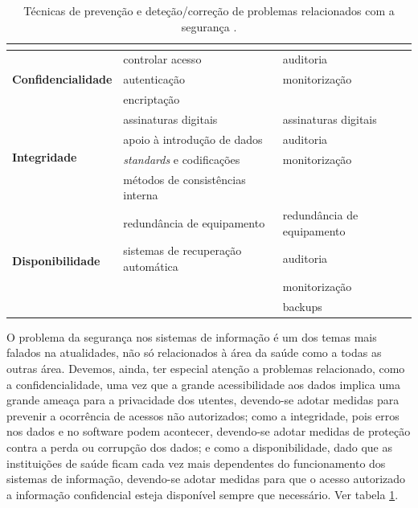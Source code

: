 \documentclass[conference]{IEEEtran}
\begin{document}
\begin{table}[!ht]
\centering
\caption{Técnicas de prevenção e deteção/correção de problemas relacionados com a segurança \cite{segurancaSI}.}
\label{tabl1}
\begin{adjustbox}{max width=\textwidth 	}
\begin{tabular}{ |l|l|l| }

\hline
	\multicolumn{1}{|c|}{\cellcolor[HTML]{EFEFEF}{\color[HTML]{333333}}}	&	\multicolumn{1}{|c|}{\cellcolor[HTML]{EFEFEF}{\color[HTML]{333333} \textbf{Prevenção}}}	&	\multicolumn{1}{|c|}{\cellcolor[HTML]{EFEFEF}{\color[HTML]{333333} \textbf{Deteção/Correção}}}	\\
\hline

\multirow{3}{*}{\textbf{Confidencialidade}}			&	controlar acesso					&	auditoria					\\
													&	autenticação						&	monitorização				\\
													&	encriptação							&								\\
\hline

\multirow{4}{*}{\textbf{Integridade}}				&	assinaturas digitais				&	assinaturas digitais		\\
													&	apoio à introdução de dados			&	auditoria					\\
													&	\textit{standards} e codificações	&	monitorização				\\
													&	métodos de consistências interna	&								\\
\hline

\multirow{4}{*}{\textbf{Disponibilidade}}			&	redundância de equipamento			&	redundância de equipamento	\\
													&	sistemas de recuperação automática	&	auditoria					\\
													&										&	monitorização				\\
													&										&	backups 					\\
\hline

\end{tabular}
\end{adjustbox}
\end{table}

O problema da segurança nos sistemas de informação é um dos temas mais falados na atualidades, não só relacionados à área da saúde como a todas as outras área. Devemos, ainda, ter especial atenção a problemas relacionado, como a confidencialidade, uma vez que a grande acessibilidade aos dados implica uma grande ameaça para a privacidade dos utentes, devendo-se adotar medidas para prevenir a ocorrência de acessos não autorizados; como a integridade, pois erros nos dados e no software podem acontecer, devendo-se adotar medidas de proteção contra a perda ou corrupção dos dados; e como a disponibilidade, dado que as instituições de saúde ficam cada vez mais dependentes do funcionamento dos sistemas de informação, devendo-se adotar medidas para que o acesso autorizado a informação confidencial esteja disponível sempre que necessário. Ver tabela \ref{tabl1}.
\end{document}
